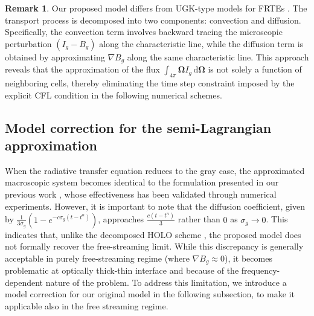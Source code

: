 \documentclass[preprint,12pt]{elsarticle}
\theoremstyle{definition}
\newtheorem{remark}{Remark}[section]
\theoremstyle{plain}
\numberwithin{equation}{section}
\numberwithin{algorithm}{section}
\newcounter{eq_count}
\newcounter{tab_count}
\newcommand{\vOmega}{\mathbf{\Omega}}
\begin{document}
\begin{remark}
Our proposed model differs from UGK-type models for FRTEs \cite{sun2015asymptoticB,li2024unified,yang2025unified}. The transport process is decomposed into two components: convection and diffusion. Specifically, the convection term involves backward tracing the microscopic perturbation $\left( I_g - B_g \right)$ along the characteristic line, while the diffusion term is obtained by approximating $\nabla B_g$ along the same characteristic line. This approach reveals that the approximation of the flux $\int_{4\pi} \vOmega I_g \,\mathrm{d}\vOmega$ is not solely a function of neighboring cells, thereby eliminating the time step constraint imposed by the explicit CFL condition in the following numerical schemes.

     
\end{remark}


    \subsection{Model correction for the semi-Lagrangian approximation}
    When the radiative transfer equation reduces to the gray case, the approximated macroscopic system becomes identical to the formulation presented in our previous work \cite{shi2023efficient}, whose effectiveness has been validated through numerical experiments.  However, it is important to note that the diffusion coefficient, given by $\frac{1}{3 \sigma_g}(1-e^{-c\sigma_g (t-t^n)})$, approaches $\frac{c(t-t^n)}{3}$ rather than $0$ as $\sigma_g \rightarrow 0$. This indicates that, unlike the decomposed HOLO scheme \cite{feng2025decomposed}, the proposed model does not formally recover the free-streaming limit. While this discrepancy is generally acceptable in purely free-streaming regime (where $\nabla B_g \approx 0$), it becomes problematic at optically thick-thin interface and because of the frequency-dependent nature of the problem. To address this limitation, we introduce a model correction for our original model in the following subsection, to make it applicable also in the free streaming regime.
\end{document}

